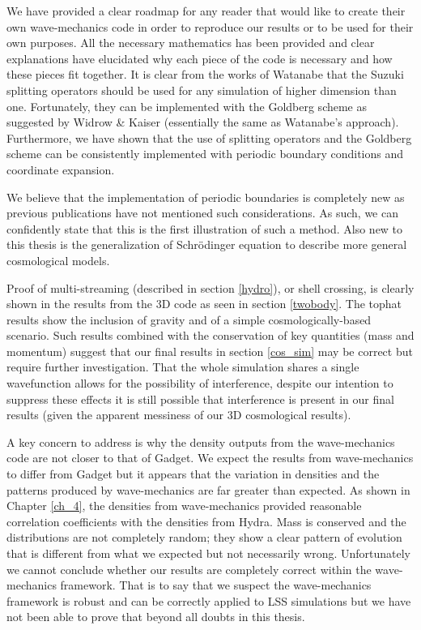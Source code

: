 We have provided a clear roadmap for any reader that would like to create their own wave-mechanics code in order to reproduce our results or to be used for their own purposes. All the necessary mathematics has been provided and clear explanations have elucidated why each piece of the code is necessary and how these pieces fit together. It is clear from the works of Watanabe that the Suzuki splitting operators should be used for any simulation of higher dimension than one. Fortunately, they can be implemented with the Goldberg scheme as suggested by Widrow \& Kaiser (essentially the same as Watanabe's approach). Furthermore, we have shown that the use of splitting operators and the Goldberg scheme can be consistently implemented with periodic boundary conditions and coordinate expansion.

We believe that the implementation of periodic boundaries is completely new as previous publications have not mentioned such considerations. As such, we can confidently state that this is the first illustration of such a method. Also new to this thesis is the generalization of Schr\"odinger equation to describe more general cosmological models.

Proof of multi-streaming (described in section \ref{hydro}), or shell crossing, is clearly shown in the results from the 3D code as seen in section \ref{twobody}. The tophat results show the inclusion of gravity and of a simple cosmologically-based scenario. Such results combined with the conservation of key quantities (mass and momentum) suggest that our final results in section \ref{cos_sim} may be correct but require further investigation. That the whole simulation shares a single wavefunction allows for the possibility of interference, despite our intention to suppress these effects it is still possible that interference is present in our final results (given the apparent messiness of our 3D cosmological results).

A key concern to address is why the density outputs from the wave-mechanics code are not closer to that of Gadget. We expect the results from wave-mechanics to differ from Gadget but it appears that the variation in densities and the patterns produced by wave-mechanics are far greater than expected. As shown in Chapter \ref{ch_4}, the densities from wave-mechanics provided reasonable correlation coefficients with the densities from Hydra. Mass is conserved and the distributions are not completely random; they show a clear pattern of evolution that is different from what we expected but not necessarily wrong. Unfortunately we cannot conclude whether our results are completely correct within the wave-mechanics framework. That is to say that we suspect the wave-mechanics framework is robust and can be correctly applied to LSS simulations but we have not been able to prove that beyond all doubts in this thesis. 

